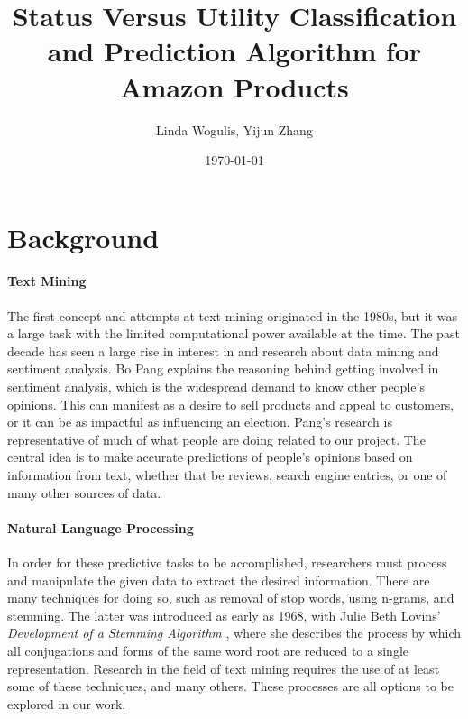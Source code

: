 \documentclass[dvips,12pt]{article}
\begin{document}

\title{\textbf{Status Versus Utility Classification and Prediction Algorithm for Amazon Products}}
\author{Linda Wogulis, Yijun Zhang}
\date{\today}



\maketitle


\section{Background}


\paragraph{Text Mining}
The first concept and attempts at text mining originated in the 1980s, but it was a large task with the limited computational power available at the time. The past decade has seen a large rise in interest in and research about data mining and sentiment analysis. Bo Pang\cite{pang2008opinion} explains the reasoning behind getting involved in sentiment analysis, which is the widespread demand to know other people's opinions. This can manifest as a desire to sell products and appeal to customers, or it can be as impactful as influencing an election. Pang's research is representative of much of what people are doing related to our project. The central idea is to make accurate predictions of people's opinions based on information from text, whether that be reviews, search engine entries, or one of many other sources of data. 

\paragraph{Natural Language Processing}
	In order for these predictive tasks to be accomplished, researchers must process and manipulate the given data to extract the desired information. There are many techniques for doing so, such as removal of stop words, using n-grams, and stemming. The latter was introduced as early as 1968, with Julie Beth Lovins' \textit{Development of a Stemming Algorithm} \cite{lovins1968development}, where she describes the process by which all conjugations and forms of the same word root are reduced to a single representation. Research in the field of text mining requires the use of at least some of these techniques, and many others. These processes are all options to be explored in our work.
\end{document}

